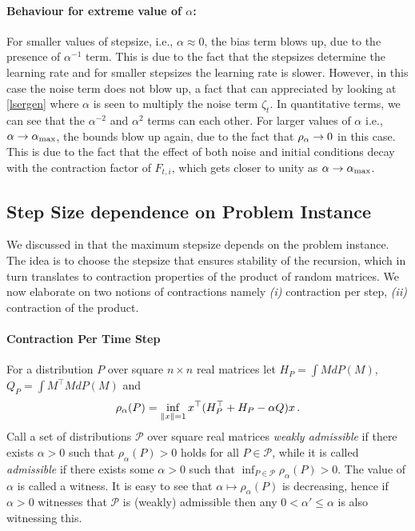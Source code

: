 \paragraph{Behaviour for extreme value of $\alpha$:} For smaller values of stepsize, i.e., $\alpha\approx 0$, the bias term blows up, due to the presence of $\alpha^{-1}$ term. This is due to the fact that the stepsizes determine the learning rate and for smaller stepsizes the learning rate is slower. However, in this case the noise term does not blow up, a fact that can appreciated by looking at \eqref{lsergen} where $\alpha$ is seen to multiply the noise term $\zeta_t$. In quantitative terms, we can see that the $\alpha^{-2}$ and $\alpha^2$ terms can each other. For larger values of $\alpha$ i.e., $\alpha\rightarrow \alpha_{\max}$, the bounds blow up again, due to the fact that $\rho_{\alpha}\rightarrow 0$ in this case. This is due to the fact that the effect of both noise and initial conditions decay with the contraction factor of $F_{t,i}$, which gets closer to unity as $\alpha\rightarrow\alpha_{\max}$.


\subsection{Step Size dependence on Problem Instance}
\label{sec:stepprob}
We discussed in  that the maximum stepsize depends on the problem instance. The idea is to choose the stepsize that ensures stability of the recursion, which in turn translates to contraction properties of the product of random matrices. We now elaborate on two notions of contractions namely 
\emph{(i)} contraction per step, \emph{(ii)} contraction of the product.

\paragraph{Contraction Per Time Step}
For a distribution $P$ over square $n\times n$ real matrices let $H_P = \int M dP(M)$, $Q_P = \int M^\top M dP(M)$ and
\begin{align*}
\rho_\alpha(P) = \inf_{\left\| x\right\|=1} x^\top (H_P^\top + H_P - \alpha Q) x\,.
\end{align*}
\newcommand{\cP}{\mathcal{P}}
Call a set of distributions $\cP$ over square real matrices 
\emph{weakly admissible} if there exists $\alpha>0$ such that 
$\rho_\alpha(P)>0$ holds for all $P\in \cP$,
while it is called \emph{admissible} 
if there exists some $\alpha>0$ such that $\inf_{P\in \cP} \rho_\alpha(P)>0$. 
The value of $\alpha$ is called a witness. 
It is easy to see that $\alpha \mapsto \rho_\alpha(P)$ is decreasing, 
hence if $\alpha>0$ witnesses that $\cP$ is (weakly) admissible 
then any $0<\alpha'\le \alpha$ is also witnessing this.

